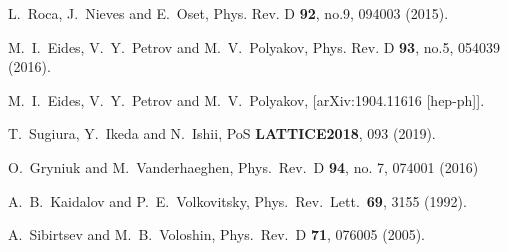 \documentclass[prd,amsmath,%
twocolumn,floatfix,amssymb, preprintnumbers, linenumbers,nofootinbib, superscriptaddress]{revtex4}
\begin{document}
\begin{thebibliography}{99}
L.~Roca, J.~Nieves and E.~Oset,
Phys. Rev. D \textbf{92}, no.9, 094003 (2015). 


M.~I.~Eides, V.~Y.~Petrov and M.~V.~Polyakov,
Phys. Rev. D \textbf{93}, no.5, 054039 (2016).


M.~I.~Eides, V.~Y.~Petrov and M.~V.~Polyakov,
[arXiv:1904.11616 [hep-ph]].


T.~Sugiura, Y.~Ikeda and N.~Ishii,
PoS \textbf{LATTICE2018}, 093 (2019). 







  O.~Gryniuk and M.~Vanderhaeghen,
  Phys.\ Rev.\ D {\bf 94}, no. 7, 074001 (2016)

  A.~B.~Kaidalov and P.~E.~Volkovitsky,
  Phys.\ Rev.\ Lett.\  {\bf 69}, 3155 (1992).


  A.~Sibirtsev and M.~B.~Voloshin,
  Phys.\ Rev.\ D {\bf 71}, 076005 (2005).



\end{thebibliography}
\end{document}
